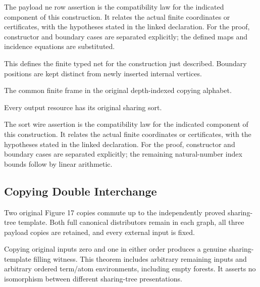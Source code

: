 The payload ne row assertion is the compatibility law for the indicated component of this construction. It relates the actual finite coordinates or certificates, with the hypotheses stated in the linked declaration.
For the proof, constructor and boundary cases are separated explicitly; the defined maps and incidence equations are substituted.
\par{}

This defines the finite typed net for the construction just described. Boundary positions are kept distinct from newly inserted internal vertices.
\par{}

The common finite frame in the original depth-indexed copying alphabet.
\par{}

Every output resource has its original sharing sort.
\par{}

The sort wire assertion is the compatibility law for the indicated component of this construction. It relates the actual finite coordinates or certificates, with the hypotheses stated in the linked declaration.
For the proof, constructor and boundary cases are separated explicitly; the remaining natural-number index bounds follow by linear arithmetic.
\par{}

\subsection{Copying Double Interchange}
Two original Figure 17 copies commute up to the independently proved sharing-tree template. Both full canonical distributors remain in each graph, all three payload copies are retained, and every external input is fixed.

Copying original inputs zero and one in either order produces a genuine sharing-template filling witness. This theorem includes arbitrary remaining inputs and arbitrary ordered term/atom environments, including empty forests. It asserts no isomorphism between different sharing-tree presentations.
\par{}

